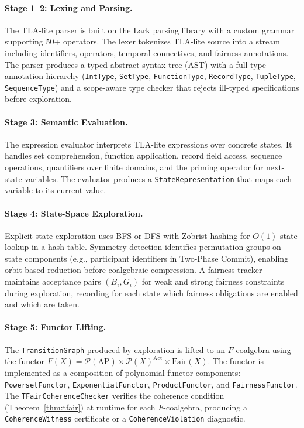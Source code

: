 \documentclass[11pt]{article}
\newcommand{\Pow}{\mathcal{P}}
\newcommand{\Fair}{\ensuremath{\mathrm{Fair}}}
\newcommand{\Act}{\ensuremath{\mathrm{Act}}}
\newcommand{\AP}{\ensuremath{\mathrm{AP}}}
\begin{document}
\paragraph{Stage 1--2: Lexing and Parsing.}
The TLA-lite parser is built on the Lark parsing library with a custom
grammar supporting 50+ operators.
The lexer tokenizes TLA-lite source into a stream including identifiers,
operators, temporal connectives, and fairness annotations.
The parser produces a typed abstract syntax tree (AST) with a full type
annotation hierarchy (\texttt{IntType}, \texttt{SetType},
\texttt{FunctionType}, \texttt{RecordType}, \texttt{TupleType},
\texttt{SequenceType}) and a scope-aware type checker that rejects
ill-typed specifications before exploration.

\paragraph{Stage 3: Semantic Evaluation.}
The expression evaluator interprets TLA-lite expressions over concrete
states.
It handles set comprehension, function application, record field access,
sequence operations, quantifiers over finite domains, and the priming
operator for next-state variables.
The evaluator produces a \texttt{StateRepresentation} that maps each
variable to its current value.

\paragraph{Stage 4: State-Space Exploration.}
Explicit-state exploration uses BFS or DFS with Zobrist hashing for $O(1)$
state lookup in a hash table.
Symmetry detection identifies permutation groups on state components
(e.g., participant identifiers in Two-Phase Commit), enabling orbit-based
reduction before coalgebraic compression.
A fairness tracker maintains acceptance pairs $(B_i, G_i)$ for weak and
strong fairness constraints during exploration, recording for each state
which fairness obligations are enabled and which are taken.

\paragraph{Stage 5: Functor Lifting.}
The \texttt{TransitionGraph} produced by exploration is lifted to an
$F$-coalgebra using the functor
$F(X) = \Pow(\AP) \times \Pow(X)^{\Act} \times \Fair(X)$.
The functor is implemented as a composition of polynomial functor
components: \texttt{PowersetFunctor}, \texttt{ExponentialFunctor},
\texttt{ProductFunctor}, and \texttt{FairnessFunctor}.
The \texttt{TFairCoherenceChecker} verifies the coherence condition
(Theorem~\ref{thm:tfair}) at runtime for each $F$-coalgebra, producing
a \texttt{CoherenceWitness} certificate or a \texttt{CoherenceViolation}
diagnostic.
\end{document}
